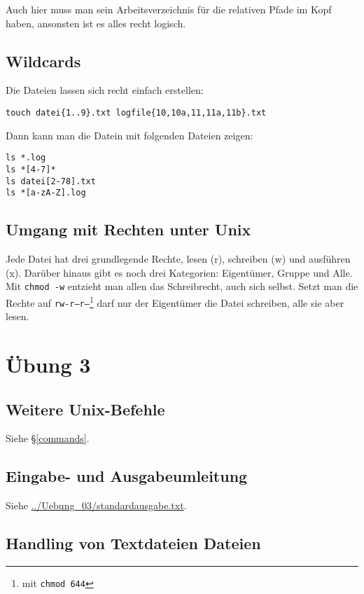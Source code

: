 \documentclass[10pt]{article}
\begin{document}
Auch hier muss man sein Arbeitsverzeichnis für die relativen Pfade im Kopf haben, ansonsten ist es alles recht logisch.

\subsection{Wildcards}

Die Dateien lassen sich recht einfach erstellen:
\begin{verbatim}
touch datei{1..9}.txt logfile{10,10a,11,11a,11b}.txt
\end{verbatim}

Dann kann man die Datein mit folgenden Dateien zeigen:
\begin{verbatim}
ls *.log
ls *[4-7]*
ls datei[2-78].txt
ls *[a-zA-Z].log
\end{verbatim}

\subsection{Umgang mit Rechten unter Unix}

Jede Datei hat drei grundlegende Rechte, lesen (r), schreiben (w) und ausführen (x). Darüber hinaus gibt es noch drei Kategorien: Eigentümer, Gruppe und Alle. Mit \texttt{chmod -w} entzieht man allen das Schreibrecht, auch sich selbst. Setzt man die Rechte auf \texttt{rw-r--r--}\footnote{mit \texttt{chmod 644}} darf nur der Eigentümer die Datei schreiben, alle sie aber lesen.

\section{Übung 3}

\subsection{Weitere Unix-Befehle}

Siehe §\ref{commands}.

\subsection{Eingabe- und Ausgabeumleitung}

Siehe \url{../Uebung_03/standardausgabe.txt}.

\subsection{Handling von Textdateien Dateien}
\end{document}
